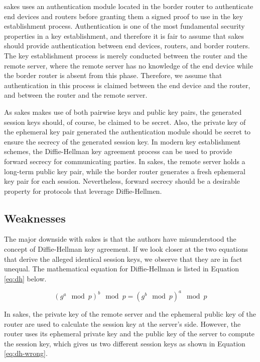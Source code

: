 \gls{sakes} uses an authentication module located in the border router to authenticate end devices and routers before granting them a signed proof to use in the key establishment process. Authentication is one of the most fundamental security properties in a key establishment, and therefore it is fair to assume that \gls{sakes} should provide authentication between end devices, routers, and border routers. The key establishment process is merely conducted between the router and the remote server, where the remote server has no knowledge of the end device while the border router is absent from this phase. Therefore, we assume that authentication in this process is claimed between the end device and the router, and between the router and the remote server.

As \gls{sakes} makes use of both pairwise keys and public key pairs, the generated session keys should, of course, be claimed to be secret. Also, the private key of the ephemeral key pair generated the authentication module should be secret to ensure the secrecy of the generated session key. In modern key establishment schemes, the Diffie-Hellman key agreement process can be used to provide forward secrecy for communicating parties. In \gls{sakes}, the remote server holds a long-term public key pair, while the border router generates a fresh ephemeral key pair for each session. Nevertheless, forward secrecy should be a desirable property for protocols that leverage Diffie-Hellmen. 


\subsection{Weaknesses}

The major downside with \gls{sakes} is that the authors have misunderstood the concept of Diffie-Hellman key agreement. If we look closer at the two equations that derive the alleged identical session keys, we observe that they are in fact unequal. The mathematical equation for Diffie-Hellman is listed in Equation \ref{eq:dh} below.

\begin{equation}
\label{eq:dh}
(g^a \mod p)^b \mod p = (g^b \mod p)^a \mod p
\end{equation}

In \gls{sakes}, the private key of the remote server and the ephemeral public key of the router are used to calculate the session key at the server's side. However, the router uses its ephemeral private key and the public key of the server to compute the session key, which gives us two different session keys as shown in Equation \ref{eq:dh-wrong}.

